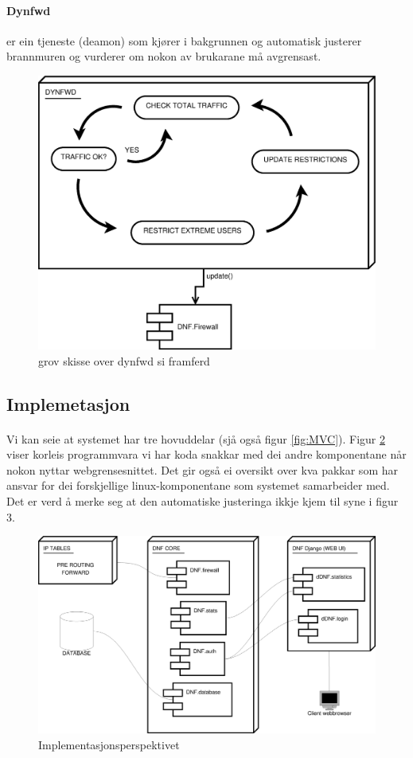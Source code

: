 \documentclass[nynorsk,12pt,a4paper]{article}
\begin{document}
\paragraph{Dynfwd} er ein tjeneste (deamon) som kjører i bakgrunnen og automatisk justerer brannmuren og vurderer om nokon av brukarane må avgrensast.
\begin{figure}[h!]
	\centering
	\includegraphics[scale=0.5]{imgs/dyndw.eps}
	\caption{grov skisse over dynfwd si framferd}
	\label{fig:dynfw}
\end{figure}

\newpage
\subsection{Implemetasjon}
\paragraph{}
Vi kan seie at systemet har tre hovuddelar (sjå også figur \ref{fig:MVC}). Figur \ref{fig:impl} viser korleis programmvara vi har koda snakkar med dei andre komponentane når nokon nyttar webgrensesnittet. Det gir også ei oversikt over kva pakkar som har ansvar for dei forskjellige linux-komponentane som systemet samarbeider med. Det er verd å merke seg at den automatiske justeringa ikkje kjem til syne i figur 3.
\begin{figure}[h!]
	\centering
	\includegraphics[scale=0.45]{imgs/implementasjon.eps}	
	\caption{Implementasjonsperspektivet}
	\label{fig:impl}
\end{figure}
\end{document}
